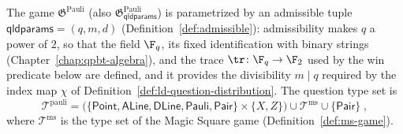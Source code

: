 \begin{definition}\label{def:pauli-question-distribution}
	\leanok
	The game $\mathfrak{G}^{\mathrm{Pauli}}$ (also $\mathfrak{G}^{\mathrm{Pauli}}_{\mathsf{qldparams}}$) is parametrized by an admissible tuple $\mathsf{qldparams} = (q,m,d)$ (Definition~\ref{def:admissible}): admissibility makes $q$ a power of $2$, so that the field $\F_q$, its fixed identification with binary strings (Chapter~\ref{chap:qpbt-algebra}), and the trace $\tr\colon \F_q \to \F_2$ used by the win predicate below are defined, and it provides the divisibility $m \mid q$ required by the index map $\chi$ of Definition~\ref{def:ld-question-distribution}. The question type set is
	\begin{equation}
		\label{eq:pauli-type}
		\mathcal T^{\mathrm{pauli}} = \bigl( \{\mathsf{Point}, \mathsf{ALine}, \mathsf{DLine}, \mathsf{Pauli}, \mathsf{Pair}\} \times \{X,Z\} \bigr) \cup \mathcal T^{\mathrm{ms}} \cup \{\mathsf{Pair}\}\;,
	\end{equation}
	where $\mathcal T^{\mathrm{ms}}$ is the type set of the Magic Square game (Definition~\ref{def:ms-game}).


\end{definition}
